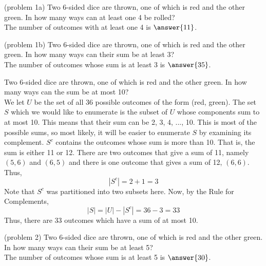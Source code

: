 \documentclass[handout]{ximera}
\begin{document}
\begin{problem}(problem 1a)
Two 6-sided dice are thrown, one of which is red and the other green.  
In how many ways can at least one 4 be rolled?\\
The number of outcomes with at least one 4 is $\answer{11}$.
\end{problem}

\begin{problem}(problem 1b)
Two 6-sided dice are thrown, one of which is red and the other green.  
In how many ways can their sum be at least 3?\\
The number of outcomes whose sum is at least 3 is $\answer{35}$.
\end{problem}


\begin{example}[example 2]
Two 6-sided dice are thrown, one of which is red and the other green.  
In how many ways can the sum be at most 10?\\
We let $U$ be the set of all 36 possible outcomes of the form (red, green).
The set $S$ which we would like to enumerate is the subset of $U$ whose components sum to at most 10. This means that their sum can be 2, 3, 4, ..., 10. This is most of the possible sums, so most likely, it will be easier to enumerate $S$ by examining its complement.
$S^c$ contains the outcomes whose sum is more than 10. That is, the sum is either 11 or 12. There are two outcomes that give a sum of 11, namely $(5,6)$ and $(6,5)$ and there is one outcome that gives a sum of 12, $(6,6)$. Thus,
\[
|S^c| = 2 + 1 = 3
\]
Note that $S^c$ was partitioned into two subsets here.
Now, by the Rule for Complements,
\[
|S| = |U| - |S^c| = 36 -3 = 33
\]
Thus, there are 33 outcomes which have a sum of at most 10.
\end{example}


\begin{problem}(problem 2)
Two 6-sided dice are thrown, one of which is red and the other green.  
In how many ways can their sum be at least 5?\\
The number of outcomes whose sum is at least 5 is $\answer{30}$.
\end{problem}
\end{document}
